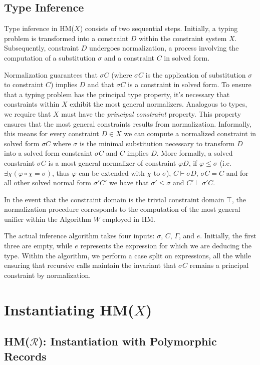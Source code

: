 \documentclass[runningheads]{llncs}
\newcommand{\hmx}{HM($X$)}
\newcommand{\hmr}{HM($\mathcal{R}$)}
\begin{document}
\subsection{Type Inference}
Type inference in \hmx{} consists of two sequential steps. Initially, a typing
problem is transformed into a constraint $D$ within the constraint system $X$.
Subsequently, constraint $D$ undergoes normalization, a process involving the
computation of a substitution $σ$ and a constraint $C$ in solved form. 

Normalization
guarantees that $σC$ (where $σC$ is the application of substitution $σ$ to constraint $C$)
implies $D$ and that $σC$ is a constraint in solved form.
To ensure that a typing problem has the principal type property, it's necessary
that constraints within $X$ exhibit the most general normalizers. Analogous to
types, we require that $X$ must have the \emph{principal constraint} property.
This property ensures that the most general constraints results from
normalization. 
Informally, this means for every constraint $D ∈ X$ we can compute a
normalized constraint in solved form $σC$ where $σ$ is the minimal substitution
necessary to transform $D$ into a solved form constraint $σC$ and $C$ implies
$D$. More formally, a solved constraint $σC$ is a most
general normalizer of constraint $φD$, if $φ ≤ σ$ (i.e. $∃χ(φ∘χ = σ)$, thus $φ$
can be extended with $χ$ to $σ$), $C ⊢ σD$, $σC = C$ and for all other solved
normal form $σ'C'$ we have that $σ' ≤ σ$ and $C' ⊢ σ'C$.

In the event that the constraint domain is the trivial constraint domain $\top$, the normalization procedure corresponds to the computation of the most general unifier within the Algorithm $W$ employed in HM.

The actual inference algorithm takes four inputs: $σ$, $C$, $Γ$, and $e$. Initially, the first three are empty, while $e$ represents the expression for which we are deducing the type. 
Within the algorithm, we perform a case split on expressions, all the while ensuring that recursive calls maintain the invariant that $σC$ remains a principal constraint by normalization.

\section{Instantiating \hmx{}}
\subsection{\hmr{}: Instantiation with Polymorphic Records}
\end{document}
